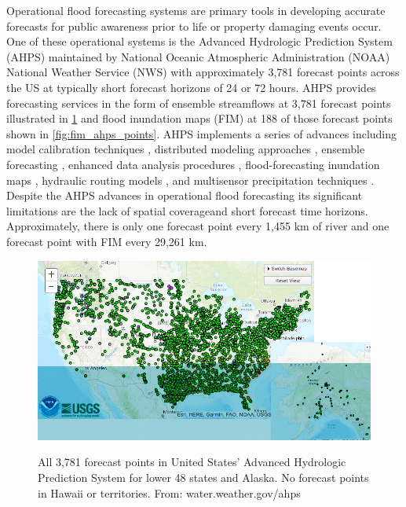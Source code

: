 Operational flood forecasting systems are primary tools in developing accurate forecasts for public awareness prior to life or property damaging events occur. 
One of these operational systems is the Advanced Hydrologic Prediction System (AHPS) maintained by National Oceanic Atmospheric Administration (NOAA) National Weather Service (NWS) with approximately 3,781 forecast points across the US at typically short forecast horizons of 24 or 72 hours\cite{mcenery2005noaa}.
AHPS provides forecasting services in the form of ensemble streamflows at 3,781 forecast points illustrated in \ref{fig:all_ahps_points} and flood inundation maps (FIM) at 188 of those forecast points shown in \ref{fig:fim_ahps_points}.
AHPS implements a series of advances including model calibration techniques \cite{zhang2003hydrologic,hogue2003multi,duan2003global,gupta2003advances,parada2003multi}, distributed modeling approaches \cite{reed2004overall,koren2004hydrology,duan2002results}, ensemble forecasting \cite{day1985extended,seo2000simulation,mullusky2002simplified,herr2002simplified}, enhanced data analysis procedures \cite{mcenery2005noaa}, flood-forecasting inundation maps \cite{cajina2002fldview}, hydraulic routing models \cite{fread1973technique,cajina2002fldview}, and multisensor precipitation techniques \cite{breidenbach1999accounting,kondragunta2001outlier,seo2002real,bonnin1996noaa}.
Despite the AHPS advances in operational flood forecasting its significant limitations are the lack of spatial coverageand short forecast time horizons.
Approximately, there is only one forecast point every 1,455 km of river and one forecast point with FIM every 29,261 km.

\begin{figure}[h!]
\centering
\includegraphics[scale=2.0]{figs/ahps_all_forecast_points.jpg}
\label{fig:all_ahps_points}
\caption{All 3,781 forecast points in United States' Advanced Hydrologic Prediction System for lower 48 states and Alaska. No forecast points in Hawaii or territories. From: water.weather.gov/ahps}
\end{figure}

